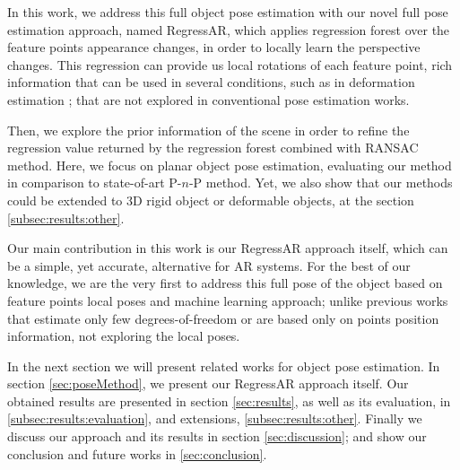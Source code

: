 \documentclass[annual]{acmsiggraph}
\begin{document}

In this work, we address this full object pose estimation with our novel full pose estimation approach, named RegressAR, which applies regression forest \cite{Criminisi:Book} over the feature points appearance changes, in order to locally learn the perspective changes. This regression can provide us local rotations of each feature point, rich information that can be used in several conditions, such as in deformation estimation \cite{Tokunaga:2015, Rendl:2014}; that are not explored in conventional pose estimation works. 

Then, we explore the prior information of the scene in order to refine the regression value returned by the regression forest combined with RANSAC method. Here, we focus on planar object pose estimation, evaluating our method in comparison to state-of-art P-$n$-P method. Yet, we also show that our methods could be extended to 3D rigid object or deformable objects, at the section \ref{subsec:results:other}.   

Our main contribution in this work is our RegressAR approach itself, which can be a simple, yet accurate, alternative for AR systems. For the best of our knowledge, we are the very first to address this full pose of the object based on feature points local poses and machine learning approach; unlike previous works that estimate only few degrees-of-freedom or are based only on points position information, not exploring the local poses.  

In the next section we will present related works for object pose estimation. In section \ref{sec:poseMethod}, we present our RegressAR approach itself. Our obtained results are presented in section \ref{sec:results}, as well as its evaluation, in \ref{subsec:results:evaluation}, and extensions, \ref{subsec:results:other}. Finally we discuss our approach and its results in section \ref{sec:discussion}; and show our conclusion and future works in \ref{sec:conclusion}.
\end{document}
